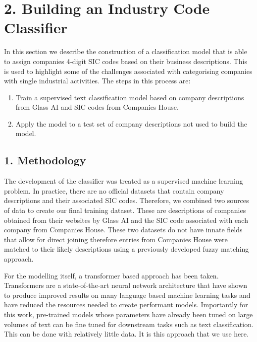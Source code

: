 \documentclass[
]{article}
\author{}
\date{}
\providecommand{\tightlist}{%
  \setlength{\itemsep}{0pt}\setlength{\parskip}{0pt}}
\begin{document}
\hypertarget{building-an-industry-code-classifier}{%
\section{2. Building an Industry Code
Classifier}\label{building-an-industry-code-classifier}}

In this section we describe the construction of a classification model
that is able to assign companies 4-digit SIC codes based on their
business descriptions. This is used to highlight some of the challenges
associated with categorising companies with single industrial
activities. The steps in this process are:

\begin{enumerate}
\def\labelenumi{\arabic{enumi}.}
\tightlist
\item
  Train a supervised text classification model based on company
  descriptions from Glass AI and SIC codes from Companies House.
\item
  Apply the model to a test set of company descriptions not used to
  build the model.
\end{enumerate}

\hypertarget{methodology}{%
\subsection{1. Methodology}\label{methodology}}

The development of the classifier was treated as a supervised machine
learning problem. In practice, there are no official datasets that
contain company descriptions and their associated SIC codes. Therefore,
we combined two sources of data to create our final training dataset.
These are descriptions of companies obtained from their websites by
Glass AI and the SIC code associated with each company from Companies
House. These two datasets do not have innate fields that allow for
direct joining therefore entries from Companies House were matched to
their likely descriptions using a previously developed fuzzy matching
approach.

For the modelling itself, a transformer based approach has been taken.
Transformers are a state-of-the-art neural network architecture that
have shown to produce improved results on many language based machine
learning tasks and have reduced the resources needed to create
performant models. Importantly for this work, pre-trained models whose
parameters have already been tuned on large volumes of text can be fine
tuned for downstream tasks such as text classification. This can be done
with relatively little data. It is this approach that we use here.
\end{document}
